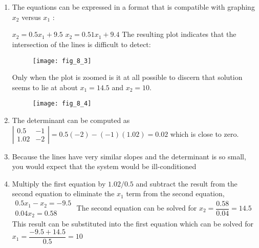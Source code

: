 \documentclass[../main.tex]{subfiles}
\begin{document}
\section{}
\begin{enumerate}[label=\bfseries(\alph*)]
\item The equations can be expressed in a format that is compatible with graphing $x_{2}$ versus $x_{1}$ :
\bigbreak

$x_{2}=0.5 x_{1}+9.5$
\bigbreak
$x_{2}=0.51 x_{1}+9.4$
\bigbreak
The resulting plot indicates that the intersection of the lines is difficult to detect:
\bigbreak
\begin{figure}[H]
		\hspace*{0.7cm}\texttt{[image: fig\_8\_3]}
		\label{fig:fig_8_3}
	\end{figure}
	\bigbreak

Only when the plot is zoomed is it at all possible to discern that solution seems to lie at about $x_{1}=14.5$ and $x_{2}=10$.
\bigbreak
\begin{figure}[H]
		\hspace*{0.7cm}\texttt{[image: fig\_8\_4]}
		\label{fig:fig_8_4}
	\end{figure}
	\bigbreak

\item The determinant can be computed as
\bigbreak
$\left|\begin{array}{cc}0.5 & -1 \\ 1.02 & -2\end{array}\right|=0.5(-2)-(-1)(1.02)=0.02$
\bigbreak
which is close to zero.
\bigbreak

\item Because the lines have very similar slopes and the determinant is so small, you would expect that the system would be ill-conditioned
\bigbreak
\item Multiply the first equation by $1.02 / 0.5$ and subtract the result from the second equation to eliminate the $x_{1}$ term from the second equation,
\bigbreak
$
\begin{aligned}
0.5 x_{1}-x_{2}=-9.5 \\
0.04 x_{2}=0.58
\end{aligned}$
\bigbreak
The second equation can be solved for
\bigbreak
$x_{2}=\dfrac{0.58}{0.04}=14.5$
\bigbreak
This result can be substituted into the first equation which can be solved for
\bigbreak
$x_{1}=\dfrac{-9.5+14.5}{0.5}=10$
\bigbreak


\end{enumerate}
\end{document}
